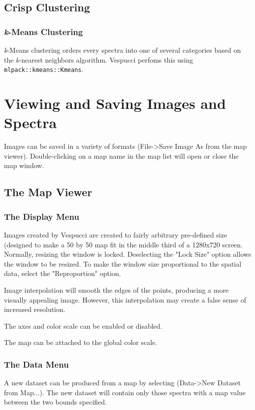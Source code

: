 \documentclass[12pt]{achemso} %
\begin{document}
\subsection{Crisp Clustering}

\subsubsection{\emph{k}-Means Clustering} \emph{k}-Means clustering orders every
spectra into one of several categories based on the \emph{k}-nearest neighbors
algorithm. Vespucci perfoms this using \texttt{mlpack::kmeans::Kmeans}.



\newpage 
\section{Viewing and Saving Images and Spectra} 
Images can be saved in a variety of formats (File->Save Image As from
the map viewer). Double-clicking on a map name in the map list will open or
close the map window. \subsection{The Map Viewer} \subsubsection{The Display
Menu} Images created by Vespucci are created to fairly arbitrary pre-defined
size (designed to make a 50 by 50 map fit in the middle third of a 1280x720
screen. Normally, resizing the window is locked. Deselecting the "Lock Size"
option allows the window to be resized. To make the window size proportional to
the spatial data, select the "Reproportion" option.

Image interpolation will smooth the edges of the points, producing a more
visually appealing image. However, this interpolation may create a false sense
of increased resolution.

The axes and color scale can be enabled or disabled.

The map can be attached to the global color scale.

\subsubsection{The Data Menu} A new dataset can be produced from a map by
selecting (Data->New Dataset from Map...). The new dataset will contain only
those spectra with a map value between the two bounds specified.
\end{document}
